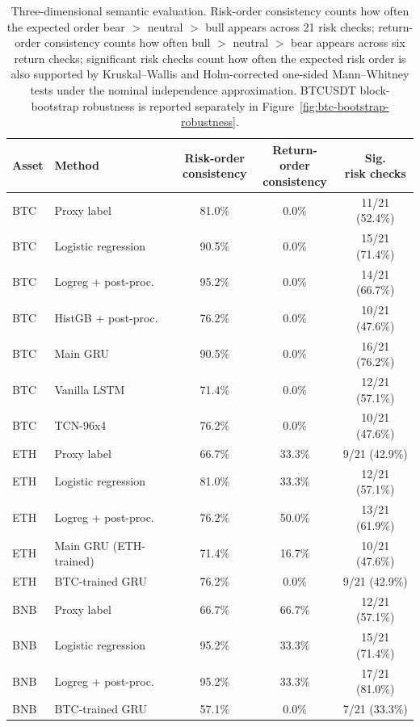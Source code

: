 \documentclass[a4paper,fleqn]{cas-dc}
\begin{document}
\begin{table}[t]
\caption{Three-dimensional semantic evaluation. Risk-order consistency counts how often the expected order bear $>$ neutral $>$ bull appears across 21 risk checks; return-order consistency counts how often bull $>$ neutral $>$ bear appears across six return checks; significant risk checks count how often the expected risk order is also supported by Kruskal--Wallis and Holm-corrected one-sided Mann--Whitney tests under the nominal independence approximation. BTCUSDT block-bootstrap robustness is reported separately in Figure~\ref{fig:btc-bootstrap-robustness}.}
\label{tab:semantic-consistency}
\centering
\scriptsize
\setlength{\tabcolsep}{3pt}
\begin{tabular}{llccc}
\toprule
Asset & Method & \shortstack{Risk-order\\consistency} & \shortstack{Return-order\\consistency} & \shortstack{Sig.\\risk checks} \\
\midrule
BTC & Proxy label & 81.0\% & 0.0\% & 11/21 (52.4\%) \\
BTC & Logistic regression & 90.5\% & 0.0\% & 15/21 (71.4\%) \\
BTC & Logreg + post-proc. & 95.2\% & 0.0\% & 14/21 (66.7\%) \\
BTC & HistGB + post-proc. & 76.2\% & 0.0\% & 10/21 (47.6\%) \\
BTC & Main GRU & 90.5\% & 0.0\% & 16/21 (76.2\%) \\
BTC & Vanilla LSTM & 71.4\% & 0.0\% & 12/21 (57.1\%) \\
BTC & TCN-96x4 & 76.2\% & 0.0\% & 10/21 (47.6\%) \\
\midrule
ETH & Proxy label & 66.7\% & 33.3\% & 9/21 (42.9\%) \\
ETH & Logistic regression & 81.0\% & 33.3\% & 12/21 (57.1\%) \\
ETH & Logreg + post-proc. & 76.2\% & 50.0\% & 13/21 (61.9\%) \\
ETH & Main GRU (ETH-trained) & 71.4\% & 16.7\% & 10/21 (47.6\%) \\
ETH & BTC-trained GRU & 76.2\% & 0.0\% & 9/21 (42.9\%) \\
\midrule
BNB & Proxy label & 66.7\% & 66.7\% & 12/21 (57.1\%) \\
BNB & Logistic regression & 95.2\% & 33.3\% & 15/21 (71.4\%) \\
BNB & Logreg + post-proc. & 95.2\% & 33.3\% & 17/21 (81.0\%) \\
BNB & BTC-trained GRU & 57.1\% & 0.0\% & 7/21 (33.3\%) \\

\end{tabular}
\end{table}
\end{document}
